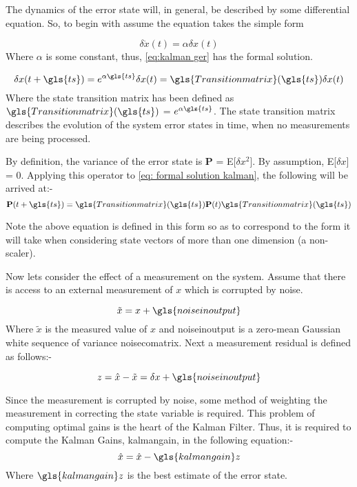 The dynamics of the error state will, in general, be described by some differential equation. So, to begin with assume the equation takes the simple form 

\begin{equation}
\delta \dot{x}(t) = \alpha\delta x(t)
\label{eq:kalman ger}
\end{equation}
Where $\alpha$ is some constant, thus, \eqref{eq:kalman ger} has the formal solution.

\begin{equation}
\delta x(t+\gls{ts}) = e^{\alpha\gls{ts}}\delta x(t) = \gls{Transitionmatrix}(\gls{ts}) \delta x(t) \label{eq: formal solution kalman}
\end{equation}
Where the state transition matrix has been defined as $\gls{Transitionmatrix}(\gls{ts})$ = $e^{\alpha \gls{ts}}$. The state transition matrix describes the evolution of the system error states in time, when no measurements are being processed.

By definition, the variance of the error state is {\bf P} = E[$\delta x^2$]. By assumption, E[$\delta x$] = 0. Applying this operator to \eqref{eq: formal solution kalman}, the following will be arrived at:-
\begin{equation}
{\bf P}(t + \gls{ts}) =  \gls{Transitionmatrix}(\gls{ts}){\bf P}(t)\gls{Transitionmatrix}(\gls{ts}) 
\label{eq:a3}
\end{equation}

Note the above equation is defined in this form so as to correspond to the form it will take when considering state vectors of more than one dimension (a non-scaler).

Now lets consider the effect of a measurement on the system. Assume that there is access to an external measurement of $x$ which is corrupted by noise.

\begin{equation}
\tilde{x} = x + \gls{noiseinoutput}
\end{equation}
Where $\tilde{x}$ is the measured value of $x$ and \gls{noiseinoutput} is a zero-mean Gaussian white sequence of variance \gls{noisecomatrix}. Next a measurement residual is defined as follows:-

\begin{equation}
z = \hat{x} - \tilde{x} = \delta x + \gls{noiseinoutput} 
\label{eq:a5}
\end{equation} 

Since the measurement is corrupted by noise, some method of weighting the measurement in correcting the state variable is required. This problem of computing optimal gains is the heart of the Kalman Filter. Thus, it is required to compute the Kalman Gains, \gls{kalmangain}, in the following equation:-
\begin{equation}
\hat{x} = \hat{x} - \gls{kalmangain}z \label{eq: a6}
\end{equation}
Where $\gls{kalmangain}z$ is the best estimate of the error state.

